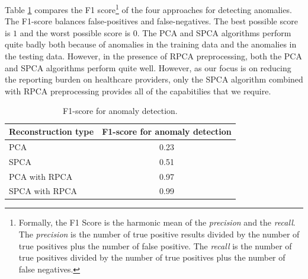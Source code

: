 \documentclass[conference]{IEEEtran}
\begin{document}
Table \ref{tab:table2} compares the F1 score\footnote{Formally, the F1 Score is the harmonic mean of the \emph{precision} and the \emph{recall}.  The  \emph{precision} is  the number of true positive results divided by the number of true positives plus the number of false positive. The \emph{recall} is the number of true positives divided by the number of true positives plus the number of false negatives.} of the four approaches for detecting anomalies.  The F1-score balances false-positives and false-negatives.  The best possible score is $1$ and the worst possible score is $0$.  The PCA and SPCA algorithms perform quite badly both because of anomalies in the training data and the anomalies in the testing data.  However, in the presence of RPCA preprocessing, both the PCA and SPCA algorithms perform quite well.  However, as our focus is on reducing the reporting burden on healthcare providers, only the SPCA algorithm combined with RPCA preprocessing provides all of the capabitilies that we require. 
\begin{table}[h!]
    \begin{center}
      \caption{F1-score for anomaly detection. }
      \label{tab:table2}
      \begin{tabular}{l|c} %
        \textbf{Reconstruction type} & \begin{minipage}{1in}\textbf{F1-score for anomaly detection}\end{minipage}\\
        \hline
        PCA &  0.23 \\
        SPCA &  0.51 \\
        PCA with RPCA &  0.97 \\
        SPCA with RPCA &  0.99 \\
      \end{tabular}
    \end{center}
\end{table}
\end{document}
